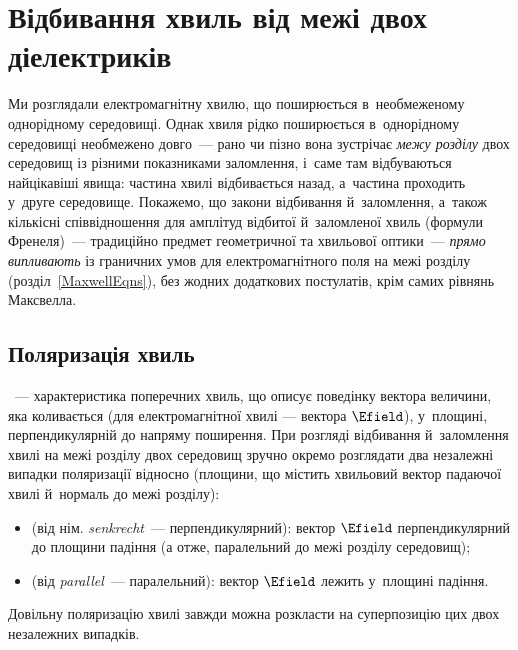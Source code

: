 \section{Відбивання хвиль від межі двох діелектриків}\hypertarget{wave-reflection-dielectrics}{}

Ми розглядали електромагнітну хвилю, що поширюється в~необмеженому однорідному середовищі. Однак хвиля рідко поширюється в~однорідному середовищі необмежено довго~--- рано чи пізно вона зустрічає \emph{межу розділу} двох середовищ із різними показниками заломлення, і~саме там відбуваються найцікавіші явища: частина хвилі відбивається назад, а~частина проходить у~друге середовище. Покажемо, що закони відбивання й~заломлення, а~також кількісні співвідношення для амплітуд відбитої й~заломленої хвиль (формули Френеля)~--- традиційно предмет геометричної та хвильової оптики~--- \emph{прямо випливають} із граничних умов для електромагнітного поля на межі розділу (розділ~\ref{MaxwellEqns}), без жодних додаткових постулатів, крім самих рівнянь Максвелла.

\subsection*{Поляризація хвиль}

~--- характеристика поперечних хвиль, що описує поведінку вектора величини, яка коливається (для електромагнітної хвилі ---
вектора $\Efield$), у~площині, перпендикулярній до напряму поширення. При розгляді відбивання й~заломлення хвилі на межі розділу двох середовищ
зручно окремо розглядати два незалежні випадки поляризації відносно  (площини, що містить хвильовий вектор падаючої хвилі
й~нормаль до межі розділу):
\begin{itemize}
	\item {} (від нім. \emph{senkrecht}~--- перпендикулярний): вектор $\Efield$ перпендикулярний до площини падіння (а
	      отже, паралельний до межі розділу середовищ);
	\item {} (від \emph{parallel}~--- паралельний): вектор $\Efield$ лежить у~площині падіння.
\end{itemize}
Довільну поляризацію хвилі завжди можна розкласти на суперпозицію цих двох незалежних випадків.

